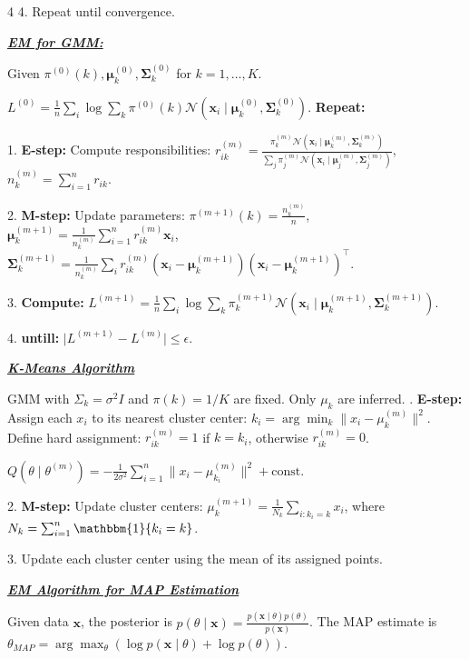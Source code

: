 \documentclass[10pt]{article}
\newcommand{\bulletPoint}[1]{\ul{\textit{\textbf{#1}}}}
\begin{document}
\begin{multicols*}{4}
4. Repeat until convergence.

\bulletPoint{EM for GMM:}\quad

Given $\pi^{(0)}(k), \boldsymbol{\mu}_k^{(0)}, \boldsymbol{\Sigma}_k^{(0)}$ for $k=1,\dots,K$. 

$L^{(0)} = \frac{1}{n} \sum_i \log \sum_k \pi^{(0)}(k) \mathcal{N} (\mathbf{x}_i \mid \boldsymbol{\mu}_k^{(0)}, \boldsymbol{\Sigma}_k^{(0)})$. 
\textbf{Repeat:}

1. \textbf{E-step:} Compute responsibilities:
    $r_{ik}^{(m)} =
    \frac{\pi_k^{(m)} \mathcal{N}(\mathbf{x}_i \mid \boldsymbol{\mu}_k^{(m)}, \boldsymbol{\Sigma}_k^{(m)})}
    {\sum_{j} \pi_j^{(m)} \mathcal{N}(\mathbf{x}_i \mid \boldsymbol{\mu}_j^{(m)}, \boldsymbol{\Sigma}_j^{(m)})}$,  
    $n_k^{(m)} = \sum_{i=1}^{n} r_{ik}$. 
    
2. \textbf{M-step:} Update parameters:
    $\pi^{(m+1)}(k) = \frac{n_k^{(m)}}{n}$,  \quad
    $\boldsymbol{\mu}_k^{(m+1)} = \frac{1}{n_k^{(m)}} \sum_{i=1}^{n} r_{ik}^{(m)} \mathbf{x}_i$,  \quad
    $\boldsymbol{\Sigma}_k^{(m+1)} =
    \frac{1}{n_k^{(m)}} \sum_i r_{ik}^{(m)}
    (\mathbf{x}_i - \boldsymbol{\mu}_k^{(m+1)})
    (\mathbf{x}_i - \boldsymbol{\mu}_k^{(m+1)})^\top$. 

3. \textbf{Compute:}
    $L^{(m+1)} = \frac{1}{n} \sum_i \log \sum_k
    \pi_k^{(m+1)} \mathcal{N}(\mathbf{x}_i \mid
    \boldsymbol{\mu}_k^{(m+1)}, \boldsymbol{\Sigma}_k^{(m+1)})$. 

4. \textbf{untill:} $\lvert L^{(m+1)} - L^{(m)} \rvert \leq \epsilon$.
    

\bulletPoint{K-Means Algorithm}\quad

GMM with $\Sigma_k = \sigma^2 I$ and $\pi(k) = 1/K$ are fixed. Only $\mu_k$ are inferred. . \textbf{E-step:} Assign each $x_i$ to its nearest cluster center: $k_i = \arg\min_{k} \|x_i - \mu_k^{(m)}\|^2$. Define hard assignment: $r_{ik}^{(m)} = 1$ if $k = k_i$, otherwise $r_{ik}^{(m)} = 0$. 

$Q(\theta \mid \theta^{(m)}) = -\frac{1}{2\sigma^2} \sum_{i=1}^{n} \|x_i - \mu_{k_i}^{(m)}\|^2 + \text{const}$. 

2. \textbf{M-step:} Update cluster centers: $\mu_k^{(m+1)} = \frac{1}{N_k} \sum_{i:k_i=k} x_i$, where $N_k = \sum_{i=1}^{n} \mathbbm{1}\{ k_i = k \}$. 

3. Update each cluster center using the mean of its assigned points.
    
\bulletPoint{EM Algorithm for MAP Estimation}\quad

Given data $\mathbf{x}$, the posterior is $p(\theta \mid \mathbf{x}) = \frac{p(\mathbf{x} \mid \theta) p(\theta)}{p(\mathbf{x})}$. The MAP estimate is $\theta_{MAP} = \arg\max_{\theta} \left( \log p(\mathbf{x} \mid \theta) + \log p(\theta) \right)$. 


\end{multicols*}
\end{document}
